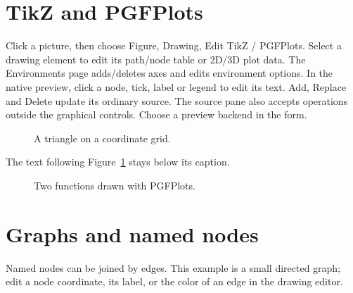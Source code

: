 \documentclass{article}
\begin{document}
\section{TikZ and PGFPlots}
Click a picture, then choose Figure, Drawing, Edit TikZ / PGFPlots.
Select a drawing element to edit its path/node table or 2D/3D plot data.
The Environments page adds/deletes axes and edits environment options.
In the native preview, click a node, tick, label or legend to edit its text.
Add, Replace and Delete update its ordinary source. The source pane also accepts
operations outside the graphical controls. Choose a preview backend in the form.

\begin{figure}[htbp]
\centering
{}
\caption{A triangle on a coordinate grid.}
\label{fig:triangle}
\end{figure}

The text following Figure~\ref{fig:triangle} stays below its caption.

\begin{figure}[htbp]
\centering
{}
\caption{Two functions drawn with PGFPlots.}
\label{fig:functions}
\end{figure}

\section{Graphs and named nodes}
Named nodes can be joined by edges. This example is a small directed graph;
edit a node coordinate, its label, or the color of an edge in the drawing editor.

\begin{center}
\end{center}
\end{document}
